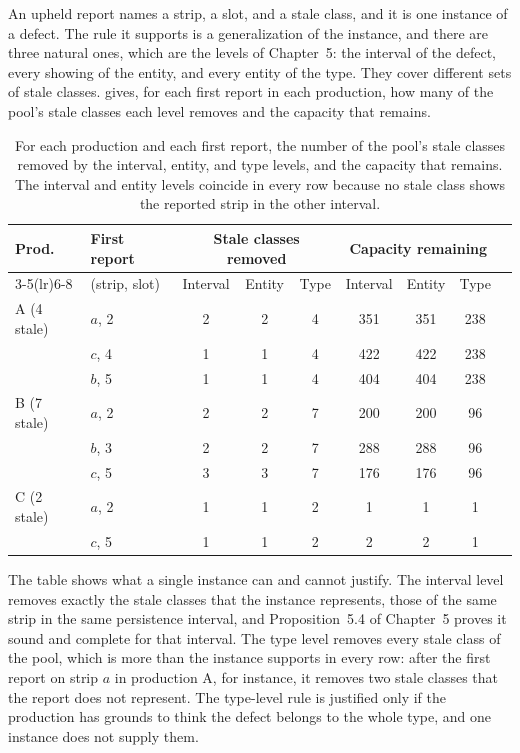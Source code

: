 \documentclass[11pt,twoside,openright]{book}
\theoremstyle{plain}
\theoremstyle{definition}
\theoremstyle{remark}
\begin{document}
An upheld report names a strip, a slot, and a stale class, and it is one instance of a defect. The rule it supports is a generalization of the instance, and there are three natural ones, which are the levels of Chapter~5: the interval of the defect, every showing of the entity, and every entity of the type. They cover different sets of stale classes.  gives, for each first report in each production, how many of the pool's stale classes each level removes and the capacity that remains.

\begin{table}[ht]
\centering
\begin{tabular}{@{}llccccccc@{}}
\toprule
Prod. & First report & \multicolumn{3}{c}{Stale classes removed} & \multicolumn{3}{c}{Capacity remaining}\\
\cmidrule(lr){3-5}\cmidrule(lr){6-8}
 & (strip, slot) & Interval & Entity & Type & Interval & Entity & Type\\
\midrule
A (4 stale) & $a$, 2 & 2 & 2 & 4 & 351 & 351 & 238\\
 & $c$, 4 & 1 & 1 & 4 & 422 & 422 & 238\\
 & $b$, 5 & 1 & 1 & 4 & 404 & 404 & 238\\
B (7 stale) & $a$, 2 & 2 & 2 & 7 & 200 & 200 & 96\\
 & $b$, 3 & 2 & 2 & 7 & 288 & 288 & 96\\
 & $c$, 5 & 3 & 3 & 7 & 176 & 176 & 96\\
C (2 stale) & $a$, 2 & 1 & 1 & 2 & 1 & 1 & 1\\
 & $c$, 5 & 1 & 1 & 2 & 2 & 2 & 1\\
\bottomrule
\end{tabular}
\caption{For each production and each first report, the number of the pool's stale classes removed by the interval, entity, and type levels, and the capacity that remains. The interval and entity levels coincide in every row because no stale class shows the reported strip in the other interval.}\label{tab:cover}
\end{table}

The table shows what a single instance can and cannot justify. The interval level removes exactly the stale classes that the instance represents, those of the same strip in the same persistence interval, and Proposition~5.4 of Chapter~5 proves it sound and complete for that interval. The type level removes every stale class of the pool, which is more than the instance supports in every row: after the first report on strip $a$ in production A, for instance, it removes two stale classes that the report does not represent. The type-level rule is justified only if the production has grounds to think the defect belongs to the whole type, and one instance does not supply them.
\end{document}
